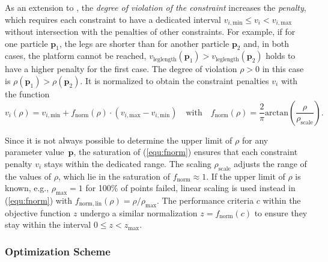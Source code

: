 As an extension to \cite{Ramirez2018}, the \emph{degree of violation of the constraint} increases the \emph{penalty}, which requires each constraint to have a dedicated interval $v_{i,\mathrm{min}} \leq v_i < v_{i,\mathrm{max}}$ without intersection with the penalties of other constraints.
For example, if for one particle $\bm{p}_1$, the legs are shorter than for another particle $\bm{p}_2$ and, in both cases, the platform cannot be reached, $v_\mathrm{leglength}(\bm{p}_1) > v_\mathrm{leglength}(\bm{p}_2)$ holds to have a higher penalty for the first case.
The degree of violation $\rho>0$ in this case is $\rho(\bm{p}_1)>\rho(\bm{p}_2)$.
It is normalized to obtain the constraint penalties $v_i$ with the function
%
\begin{equation}
v_i(\rho) = v_{i,\mathrm{min}} + f_\mathrm{norm}(\rho) \cdot (v_{i,\mathrm{max}}-v_{i,\mathrm{min}})
\quad \text{with} \quad
f_\mathrm{norm}(\rho) = \frac{2}{\pi} \mathrm{arctan}\left(\frac{\rho}{ \rho_{\mathrm{scale}}}\right).
%
%
\label{equ:fnorm}
\end{equation}

Since
it is not always possible to determine the upper limit of $\rho$ for any parameter value~$\bm{p}$, the saturation of (\ref{equ:fnorm}) ensures that each constraint penalty $v_i$ stays within the dedicated range. %
The scaling $\rho_{\mathrm{scale}}$ adjusts the range of the values of $\rho$, which lie in the saturation of $f_\mathrm{norm} \approx 1$.
If the upper limit of $\rho$ is known, e.g., $\rho_\mathrm{max}=1$ for 100\% of points failed, linear scaling is used instead in (\ref{equ:fnorm}) with $f_\mathrm{norm,lin}(\rho)=\rho/\rho_\mathrm{max}$.
The performance criteria $c$ within the objective function $z$ undergo a similar normalization $z=f_\mathrm{norm}(c)$ to ensure they stay within the interval $0 \leq z < z_{\mathrm{max}}$.


\subsubsection{{Optimization Scheme}}

